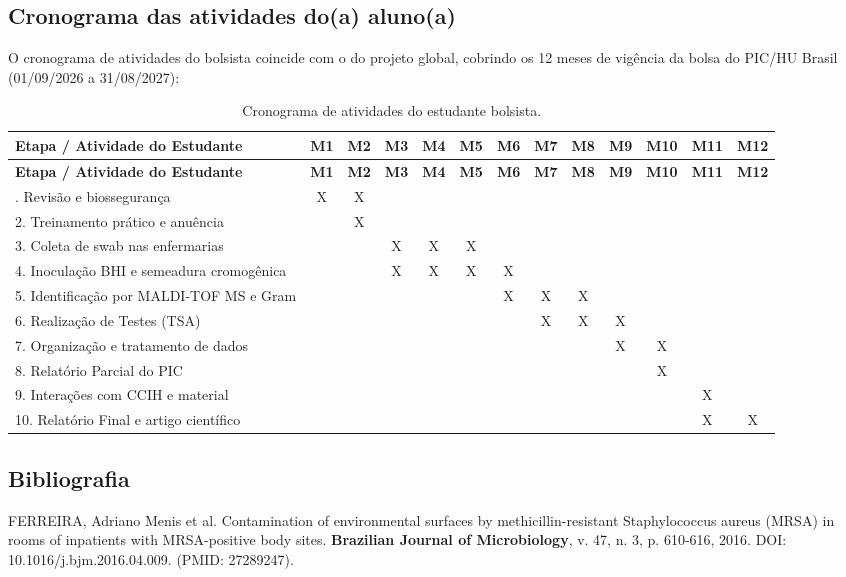 \documentclass[12pt,a4paper]{article}
\begin{document}
\begin{spacing}{1.0}
\subsection{Cronograma das atividades do(a) aluno(a)}
O cronograma de atividades do bolsista coincide com o do projeto global, cobrindo os 12 meses de vigência da bolsa do PIC/HU Brasil (01/09/2026 a 31/08/2027):

\begin{spacing}{1.0}
\begin{longtable}{lcccccccccccc}
\caption{Cronograma de atividades do estudante bolsista.}\\
\toprule
\textbf{Etapa / Atividade do Estudante} & \textbf{M1} & \textbf{M2} & \textbf{M3} & \textbf{M4} & \textbf{M5} & \textbf{M6} & \textbf{M7} & \textbf{M8} & \textbf{M9} & \textbf{M10} & \textbf{M11} & \textbf{M12} \\
\midrule
\endfirsthead
\toprule
\textbf{Etapa / Atividade do Estudante} & \textbf{M1} & \textbf{M2} & \textbf{M3} & \textbf{M4} & \textbf{M5} & \textbf{M6} & \textbf{M7} & \textbf{M8} & \textbf{M9} & \textbf{M10} & \textbf{M11} & \textbf{M12} \\
\midrule
\endhead
\bottomrule
\endfoot
1. Revisão e biossegurança & X & X & & & & & & & & & & \\
2. Treinamento prático e anuência & & X & & & & & & & & & & \\
3. Coleta de swab nas enfermarias & & & X & X & X & & & & & & & \\
4. Inoculação BHI e semeadura cromogênica & & & X & X & X & X & & & & & & \\
5. Identificação por MALDI-TOF MS e Gram & & & & & & X & X & X & & & & \\
6. Realização de Testes (TSA) & & & & & & & X & X & X & & & \\
7. Organização e tratamento de dados & & & & & & & & & X & X & & \\
8. Relatório Parcial do PIC & & & & & & & & & & X & & \\
9. Interações com CCIH e material & & & & & & & & & & & X & \\
10. Relatório Final e artigo científico & & & & & & & & & & & X & X \\
\bottomrule
\end{longtable}
\endspacing
\newpage

\section{Bibliografia}
\begin{spacing}{1.1}
\noindent FERREIRA, Adriano Menis et al. Contamination of environmental surfaces by methicillin-resistant Staphylococcus aureus (MRSA) in rooms of inpatients with MRSA-positive body sites. \textbf{Brazilian Journal of Microbiology}, v. 47, n. 3, p. 610-616, 2016. DOI: 10.1016/j.bjm.2016.04.009. (PMID: 27289247).


\end{spacing}
\end{spacing}
\end{spacing}
\end{document}
